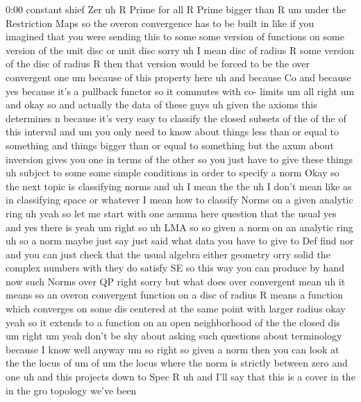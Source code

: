 \begin{unfinished}{0:00}
constant  shief  Zer  uh  R  Prime  for  all  R
Prime  bigger  than  R  um  under  the
Restriction  Maps  so  the  overon
convergence  has  to  be  built  in  like  if
you  imagined  that  you  were  sending  this
to  some  some  version  of  functions  on
some  version  of  the  unit  disc  or  unit
disc  sorry  uh  I  mean  disc  of  radius  R
some  version  of  the  disc  of  radius  R
then  that  version  would  be  forced  to  be
the  over  convergent  one  um  because  of
this  property
here
uh  and  because  Co  and  because  yes
because  it's  a  pullback  functor  so  it
commutes  with  co-
limits
um  all  right  um  and  okay  so  and  actually
the  data  of  these  guys  uh  given  the
axioms  this  determines
n  because  it's  very  easy  to  classify  the
closed  subsets  of  the  of  the  of  this
interval  and  um  you  only  need  to  know
about  things  less  than  or  equal  to
something  and  things  bigger  than  or
equal  to  something  but  the  axum  about
inversion  gives  you  one  in  terms  of  the
other  so  you  just  have  to  give  these
things  uh  subject  to  some  some  simple
conditions  in  order  to  specify  a
norm  Okay  so
the  next
topic  is  classifying
norms  and  uh  I  mean  the  the  uh  I  don't
mean  like  as  in  classifying  space  or
whatever  I  mean  how  to  classify  Norms  on
a  given  analytic
ring  uh  yeah  so  let  me  start  with  one
aemma
here
question  that  the
usual  yes  and  yes  there  is
yeah
um  right  so  uh  LMA  so  so  given  a  norm  on
an  analytic  ring  uh  so  a  norm
maybe  just  say  just  said  what  data  you
have  to  give  to  Def  find  nor  and  you  can
just  check  that  the  usual  algebra  either
geometry
orry  solid  the  complex  numbers  with  they
do  satisfy  SE  so  this  way  you  can
produce  by  hand  now  such  Norms  over
QP
right  sorry  but  what  does  over
convergent  mean  uh  it  means  so  an  overon
convergent  function  on  a  disc  of  radius
R  means  a  function  which  converges  on
some  dis  centered  at  the  same  point  with
larger
radius  okay  yeah  so  it  extends  to  a
function  on  an  open  neighborhood  of  the
the  closed
dis
um
right  um  yeah  don't  be  shy  about  asking
such  questions  about  terminology  because
I  know
well  anyway  um  so  right  so  given  a  norm
then  you  can  look  at  the  the  locus  of
um  of  um  the  locus  where  the  norm  is
strictly  between  zero  and  one  uh  and
this  projects  down  to  Spec  R  uh  and  I'll
say  that  this  is  a
cover  in  the  in  the  gro  topology  we've
been

\end{unfinished}
